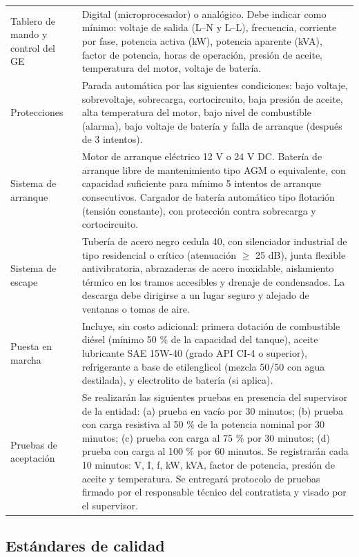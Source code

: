 \documentclass[12pt,a4paper]{article}
\begin{document}
\begin{longtable}{L{4.5cm}p{10.5cm}}
  Tablero de mando y control del GE & Digital (microprocesador) o analógico. Debe indicar como mínimo: voltaje de salida (L--N y L--L), frecuencia, corriente por fase, potencia activa (kW), potencia aparente (kVA), factor de potencia, horas de operación, presión de aceite, temperatura del motor, voltaje de batería. \\
  Protecciones & Parada automática por las siguientes condiciones: bajo voltaje, sobrevoltaje, sobrecarga, cortocircuito, baja presión de aceite, alta temperatura del motor, bajo nivel de combustible (alarma), bajo voltaje de batería y falla de arranque (después de 3 intentos). \\
  Sistema de arranque & Motor de arranque eléctrico 12 V o 24 V DC. Batería de arranque libre de mantenimiento tipo AGM o equivalente, con capacidad suficiente para mínimo 5 intentos de arranque consecutivos. Cargador de batería automático tipo flotación (tensión constante), con protección contra sobrecarga y cortocircuito. \\
  Sistema de escape & Tubería de acero negro cedula 40, con silenciador industrial de tipo residencial o crítico (atenuación $\geq$ 25 dB), junta flexible antivibratoria, abrazaderas de acero inoxidable, aislamiento térmico en los tramos accesibles y drenaje de condensados. La descarga debe dirigirse a un lugar seguro y alejado de ventanas o tomas de aire. \\
  Puesta en marcha & Incluye, sin costo adicional: primera dotación de combustible diésel (mínimo 50 \% de la capacidad del tanque), aceite lubricante SAE 15W-40 (grado API CI-4 o superior), refrigerante a base de etilenglicol (mezcla 50/50 con agua destilada), y electrolito de batería (si aplica). \\
  Pruebas de aceptación & Se realizarán las siguientes pruebas en presencia del supervisor de la entidad: (a) prueba en vacío por 30 minutos; (b) prueba con carga resistiva al 50 \% de la potencia nominal por 30 minutos; (c) prueba con carga al 75 \% por 30 minutos; (d) prueba con carga al 100 \% por 60 minutos. Se registrarán cada 10 minutos: V, I, f, kW, kVA, factor de potencia, presión de aceite y temperatura. Se entregará protocolo de pruebas firmado por el responsable técnico del contratista y visado por el supervisor. \\
  \bottomrule
\end{longtable}

\subsection{Estándares de calidad}
\end{document}
